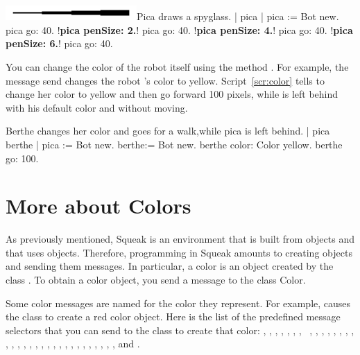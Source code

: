 \documentclass[a4paper,10pt,twoside]{book}
\begin{document}
\begin{scriptfigwithsize}[0.4]{\includegraphics[width=5cm]{turtleMPenSize}}{Pica draws a spyglass.}\label{scr:spyglass}
| pica | 
pica := Bot new. 
pica go: 40. 
!\textbf{pica penSize: 2.}!
pica go: 40. 
!\textbf{pica penSize: 4.}!
pica go: 40. 
!\textbf{pica penSize: 6.}!
pica go: 40. 
\end{scriptfigwithsize}

You can change the color of the robot itself using the method . For example, the 
message send  changes the robot ’s color to yellow. Script~\ref{scr:color} tells  to change her color to yellow and then go forward 100 pixels, while  is left 
behind with his default color and without moving.

\begin{script}[color]{Berthe changes her color and goes for a walk,while pica is left behind. }
	| pica berthe | 
	pica := Bot new. 
	berthe:= Bot new. 
	berthe color: Color yellow. 
	berthe go: 100. 
\end{script}

\section{More about Colors}

As previously mentioned, Squeak is an environment that is built from objects and that uses 
objects. Therefore, programming in Squeak amounts to creating objects and sending them 
messages. In particular, a color is an object created by the class . 
To obtain a color object, you send a message to the class Color. 

Some color messages are named for the color they represent. For example,  
causes the class  to create a red color object. Here is the list of the predefined message 
selectors that you can send to the class  to create that color: , , 
, , , , ,
~, , , , , , , , , , , , , , 
, , , , ,
, , , , , , , , and . 
\end{document}
